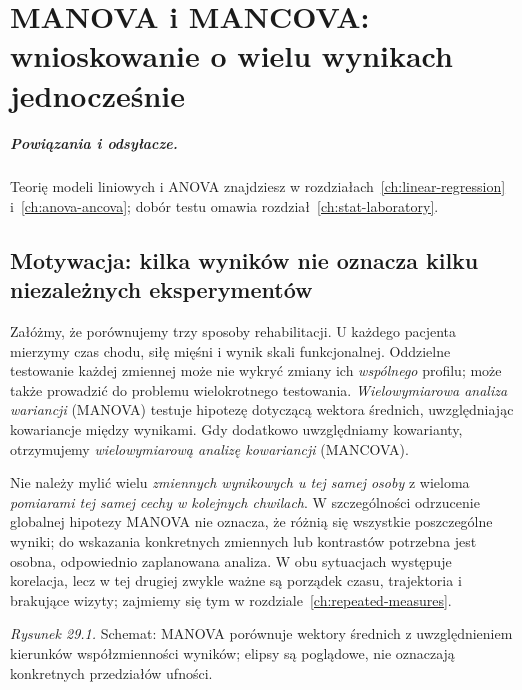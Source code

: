 \chapter{MANOVA i MANCOVA: wnioskowanie o wielu wynikach jednocześnie}
\label{ch:manova-mancova}
\paragraph{Powiązania i odsyłacze.} Teorię modeli liniowych i ANOVA znajdziesz w rozdziałach~\ref{ch:linear-regression} i~\ref{ch:anova-ancova}; dobór testu omawia rozdział~\ref{ch:stat-laboratory}.


\section{Motywacja: kilka wyników nie oznacza kilku niezależnych eksperymentów}
Załóżmy, że porównujemy trzy sposoby rehabilitacji. U każdego pacjenta mierzymy czas chodu, siłę mięśni i wynik skali funkcjonalnej. Oddzielne testowanie każdej zmiennej może nie wykryć zmiany ich \emph{wspólnego} profilu; może także prowadzić do problemu wielokrotnego testowania. \emph{Wielowymiarowa analiza wariancji} (MANOVA) testuje hipotezę dotyczącą wektora średnich, uwzględniając kowariancje między wynikami. Gdy dodatkowo uwzględniamy kowarianty, otrzymujemy \emph{wielowymiarową analizę kowariancji} (MANCOVA).

Nie należy mylić wielu \emph{zmiennych wynikowych u tej samej osoby} z wieloma \emph{pomiarami tej samej cechy w kolejnych chwilach}. W szczególności odrzucenie globalnej hipotezy MANOVA nie oznacza, że różnią się wszystkie poszczególne wyniki; do wskazania konkretnych zmiennych lub kontrastów potrzebna jest osobna, odpowiednio zaplanowana analiza. W obu sytuacjach występuje korelacja, lecz w tej drugiej zwykle ważne są porządek czasu, trajektoria i brakujące wizyty; zajmiemy się tym w rozdziale~\ref{ch:repeated-measures}.

\begin{center}

{\small\emph{Rysunek 29.1.} Schemat: MANOVA porównuje wektory średnich z uwzględnieniem kierunków współzmienności wyników; elipsy są poglądowe, nie oznaczają konkretnych przedziałów ufności.}
\end{center}

